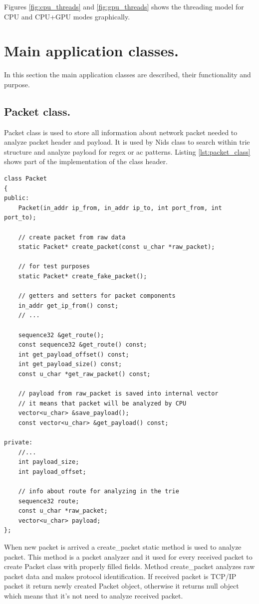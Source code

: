 \documentclass[thesis=M,english]{FITthesis}[2011/07/15]
\begin{document}
Figures \ref{fig:cpu_threads} and \ref{fig:gpu_threads} shows the threading model for CPU and CPU+GPU modes graphically.

\section{Main application classes.}
In this section the main application classes are described, their functionality and purpose.

\subsection{Packet class.}
Packet class is used to store all information about network packet needed to analyze packet header and payload. It is used by Nids class to search within trie structure and analyze payload for regex or ac patterns. Listing \ref{lst:packet_class} shows part of the implementation of the class header.

\begin{lstlisting}
class Packet
{
public:
    Packet(in_addr ip_from, in_addr ip_to, int port_from, int port_to);

    // create packet from raw data
    static Packet* create_packet(const u_char *raw_packet);

    // for test purposes
    static Packet* create_fake_packet();

    // getters and setters for packet components
    in_addr get_ip_from() const;
    // ...

    sequence32 &get_route();
    const sequence32 &get_route() const;
    int get_payload_offset() const;
    int get_payload_size() const;
    const u_char *get_raw_packet() const;

    // payload from raw_packet is saved into internal vector
    // it means that packet will be analyzed by CPU
    vector<u_char> &save_payload();
    const vector<u_char> &get_payload() const;

private:
    //...
    int payload_size;
    int payload_offset;

    // info about route for analyzing in the trie
    sequence32 route;
    const u_char *raw_packet;
    vector<u_char> payload;
};
\end{lstlisting}

When new packet is arrived a create\_packet static method is used to analyze packet. This method is a packet analyzer and it used for every received packet to create Packet class with properly filled fields. Method create\_packet analyzes raw packet data and makes protocol identification. If received packet is TCP/IP packet it return newly created Packet object, otherwise it returns null object which means that it's not need to analyze received packet.
\end{document}
